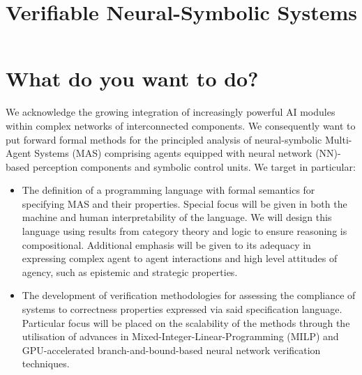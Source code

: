 \documentclass[11pt]{article}
\title{Verifiable Neural-Symbolic Systems}
\date{}
\begin{document}
\maketitle
\section{What do you want to do?}



We acknowledge the growing integration of increasingly powerful AI modules
within complex networks of interconnected components. We consequently want to
put forward formal methods for the principled analysis of neural-symbolic
Multi-Agent Systems (MAS) comprising agents equipped with neural network (NN)-based perception components and symbolic control units. We target in particular:
\begin{itemize}
    \item  The definition of a programming language with formal semantics for
specifying MAS and their properties. Special focus will be given in both the
machine and human interpretability of the language.  We will design this
language using results from category theory and logic to ensure reasoning is
compositional.  Additional emphasis will be given to  its adequacy in expressing
complex agent to agent interactions and high level attitudes of agency, such as
epistemic and strategic properties.
    \item The development of  verification methodologies for assessing the
compliance of systems  to correctness properties expressed via said
specification language. Particular focus will be placed on the scalability of
the methods through the utilisation of advances in
Mixed-Integer-Linear-Programming (MILP) and GPU-accelerated
branch-and-bound-based neural network verification techniques.
\end{itemize}


\end{document}
